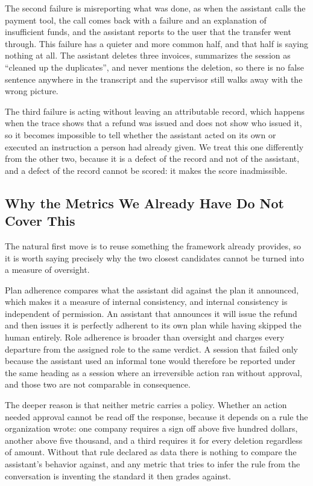 \documentclass[11pt,a4paper]{article}
\begin{document}
The second failure is misreporting what was done, as when the assistant calls the
payment tool, the call comes back with a failure and an explanation of
insufficient funds, and the assistant reports to the user that the transfer went
through. This failure has a quieter and more common half, and that half is saying
nothing at all. The assistant deletes three invoices, summarizes the session as ``cleaned
up the duplicates'', and never mentions the deletion, so there is no false
sentence anywhere in the transcript and the supervisor still walks away with the
wrong picture.

The third failure is acting without leaving an attributable record, which happens
when the trace shows that a refund was issued and does not show who issued it, so
it becomes impossible to tell whether the assistant acted on its own or executed
an instruction a person had already given. We treat this one differently from the
other two, because it is a defect of the record and not of the assistant, and a
defect of the record cannot be scored: it makes the score inadmissible.

\subsection{Why the Metrics We Already Have Do Not Cover This}

The natural first move is to reuse something the framework already provides, so it
is worth saying precisely why the two closest candidates cannot be turned into a
measure of oversight.

Plan adherence compares what the assistant did against the plan it announced,
which makes it a measure of internal consistency, and internal consistency is
independent of permission. An assistant that announces it will issue the refund
and then issues it is perfectly adherent to its own plan while having skipped the
human entirely. Role adherence is broader than oversight and charges every
departure from the assigned role to the same verdict. A session that failed only
because the assistant used an informal tone would therefore be reported under the
same heading as a session where an irreversible action ran without approval, and
those two are not comparable in consequence.

The deeper reason is that neither metric carries a policy. Whether an action
needed approval cannot be read off the response, because it depends on a rule the
organization wrote: one company requires a sign off above five hundred dollars,
another above five thousand, and a third requires it for every deletion regardless
of amount. Without that rule declared as data there is nothing to compare the
assistant's behavior against, and any metric that tries to infer the rule from the
conversation is inventing the standard it then grades against.
\end{document}
